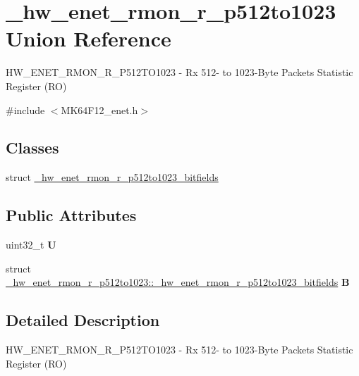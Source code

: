 \hypertarget{union__hw__enet__rmon__r__p512to1023}{}\section{\+\_\+hw\+\_\+enet\+\_\+rmon\+\_\+r\+\_\+p512to1023 Union Reference}
\label{union__hw__enet__rmon__r__p512to1023}


H\+W\+\_\+\+E\+N\+E\+T\+\_\+\+R\+M\+O\+N\+\_\+\+R\+\_\+\+P512\+T\+O1023 -\/ Rx 512-\/ to 1023-\/\+Byte Packets Statistic Register (RO)  




{\ttfamily \#include $<$M\+K64\+F12\+\_\+enet.\+h$>$}

\subsection*{Classes}
\begin{DoxyCompactItemize}
\item 
struct \hyperlink{struct__hw__enet__rmon__r__p512to1023_1_1__hw__enet__rmon__r__p512to1023__bitfields}{\+\_\+hw\+\_\+enet\+\_\+rmon\+\_\+r\+\_\+p512to1023\+\_\+bitfields}
\end{DoxyCompactItemize}
\subsection*{Public Attributes}
\begin{DoxyCompactItemize}
\item 
uint32\+\_\+t {\bfseries U}\hypertarget{union__hw__enet__rmon__r__p512to1023_a018abb489bc073e3259d25d276ea2e6f}{}\label{union__hw__enet__rmon__r__p512to1023_a018abb489bc073e3259d25d276ea2e6f}

\item 
struct \hyperlink{struct__hw__enet__rmon__r__p512to1023_1_1__hw__enet__rmon__r__p512to1023__bitfields}{\+\_\+hw\+\_\+enet\+\_\+rmon\+\_\+r\+\_\+p512to1023\+::\+\_\+hw\+\_\+enet\+\_\+rmon\+\_\+r\+\_\+p512to1023\+\_\+bitfields} {\bfseries B}\hypertarget{union__hw__enet__rmon__r__p512to1023_a7a100945564dde3721087e3e868da1ca}{}\label{union__hw__enet__rmon__r__p512to1023_a7a100945564dde3721087e3e868da1ca}

\end{DoxyCompactItemize}


\subsection{Detailed Description}
H\+W\+\_\+\+E\+N\+E\+T\+\_\+\+R\+M\+O\+N\+\_\+\+R\+\_\+\+P512\+T\+O1023 -\/ Rx 512-\/ to 1023-\/\+Byte Packets Statistic Register (RO) 

